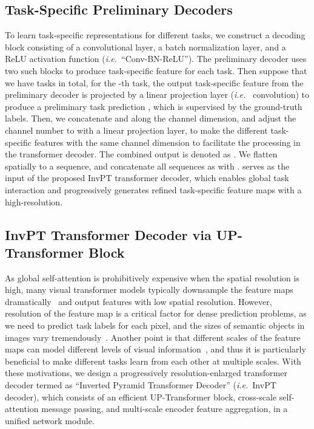 \documentclass[runningheads]{llncs}
\newcommand*{\ie}{\emph{i.e.}}
\begin{document}
\subsection{Task-Specific Preliminary Decoders}\label{sec:preliminarydecoders}
To learn task-specific representations for different tasks, we construct a decoding block consisting of a  convolutional layer, a batch normalization layer, and a ReLU activation function (\ie~``Conv-BN-ReLU''). The preliminary decoder uses two such blocks to produce task-specific feature for each task.
Then suppose that we have  tasks in total, for the -th task, the output task-specific feature  from the preliminary decoder is projected by a linear projection layer (\ie~ convolution) to produce a preliminary task prediction , which is supervised by the ground-truth labels.
Then, we concatenate  and  along the channel dimension, and adjust the channel number to  with a linear projection layer, to make the different task-specific features with the same channel dimension to facilitate the processing in the transformer decoder.
The combined output is denoted as .
We flatten  spatially to a sequence, and concatenate all  sequences as  with .  serves as the input of the proposed InvPT transformer decoder, which enables global task interaction and progressively generates refined task-specific feature maps with a high-resolution.


\subsection{InvPT Transformer Decoder via UP-Transformer Block}
\label{sec:invpt_decoder}
As global self-attention is prohibitively expensive when the spatial resolution is high, many visual transformer models typically downsample the feature maps dramatically~\cite{vit,cvt,pvt} and output features with low spatial resolution. However, resolution of the feature map is a critical factor for dense prediction problems, as we need to predict task labels for each pixel, and the sizes of semantic objects in images vary tremendously~\cite{pspnet}.
Another point is that different scales of the feature maps can model different levels of visual information~\cite{mti,hrformer}, and thus it is particularly beneficial to make different tasks learn from each other at {multiple scales}. With these motivations, we design a progressively resolution-enlarged transformer decoder termed as ``Inverted Pyramid Transformer Decoder'' (\ie~InvPT decoder), which consists of an efficient UP-Transformer block, cross-scale self-attention message passing, and multi-scale encoder feature aggregation, in a unified network module.
\end{document}
